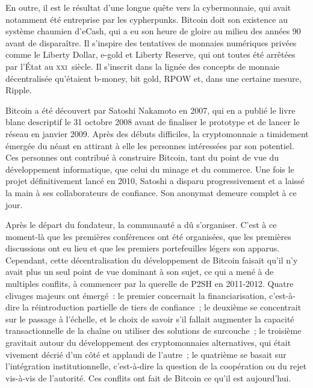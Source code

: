 En outre, il est le résultat d'une longue quête vers la cybermonnaie, qui avait notamment été entreprise par les cypherpunks. Bitcoin doit son existence au système chaumien d'eCash, qui a eu son heure de gloire au milieu des années 90 avant de disparaître. Il s'inspire des tentatives de monnaies numériques privées comme le Liberty Dollar, e-gold et Liberty Reserve, qui ont toutes été arrêtées par l'État au \textsc{xxi}\ieme{}~siècle. Il s'inscrit dans la lignée des concepts de monnaie décentralisée qu'étaient b-money, bit gold, RPOW et, dans une certaine mesure, Ripple.

Bitcoin a été découvert par Satoshi Nakamoto en 2007, qui en a publié le livre blanc descriptif le 31 octobre 2008 avant de finaliser le prototype et de lancer le réseau en janvier 2009. Après des débuts difficiles, la cryptomonnaie a timidement émergée du néant en attirant à elle les personnes intéressées par son potentiel. Ces personnes ont contribué à construire Bitcoin, tant du point de vue du développement informatique, que celui du minage et du commerce. Une fois le projet définitivement lancé en 2010, Satoshi a disparu progressivement et a laissé la main à ses collaborateurs de confiance. Son anonymat demeure complet à ce jour.

Après le départ du fondateur, la communauté a dû s'organiser. C'est à ce moment-là que les premières conférences ont été organisées, que les premières discussions ont eu lieu et que les premiers portefeuilles légers son apparus. Cependant, cette décentralisation du développement de Bitcoin faisait qu'il n'y avait plus un seul point de vue dominant à son sujet, ce qui a mené à de multiples conflits, à commencer par la querelle de P2SH en 2011-2012. Quatre clivages majeurs ont émergé~: le premier concernait la financiarisation, c'est-à-dire la réintroduction partielle de tiers de confiance~; le deuxième se concentrait sur le passage à l'échelle, et le choix de savoir s'il fallait augmenter la capacité transactionnelle de la chaîne ou utiliser des solutions de surcouche~; le troisième gravitait autour du développement des cryptomonnaies alternatives, qui était vivement décrié d'un côté et applaudi de l'autre~; le quatrième se basait sur l'intégration institutionnelle, c'est-à-dire la question de la coopération ou du rejet vis-à-vis de l'autorité. Ces conflits ont fait de Bitcoin ce qu'il est aujourd'hui.

